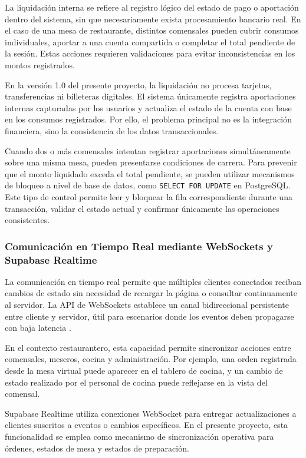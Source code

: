La liquidación interna se refiere al registro lógico del estado de pago o aportación
dentro del sistema, sin que necesariamente exista procesamiento bancario real. En el caso
de una mesa de restaurante, distintos comensales pueden cubrir consumos individuales,
aportar a una cuenta compartida o completar el total pendiente de la sesión. Estas acciones
requieren validaciones para evitar inconsistencias en los montos registrados.

En la versión 1.0 del presente proyecto, la liquidación no procesa tarjetas, transferencias
ni billeteras digitales. El sistema únicamente registra aportaciones internas capturadas
por los usuarios y actualiza el estado de la cuenta con base en los consumos registrados.
Por ello, el problema principal no es la integración financiera, sino la consistencia de los
datos transaccionales.

Cuando dos o más comensales intentan registrar aportaciones simultáneamente sobre una misma
mesa, pueden presentarse condiciones de carrera. Para prevenir que el monto liquidado exceda
el total pendiente, se pueden utilizar mecanismos de bloqueo a nivel de base de datos, como
\texttt{SELECT FOR UPDATE} en PostgreSQL. Este tipo de control permite leer y bloquear la fila
correspondiente durante una transacción, validar el estado actual y confirmar únicamente las
operaciones consistentes.

\subsubsection{Comunicación en Tiempo Real mediante WebSockets y Supabase Realtime}

La comunicación en tiempo real permite que múltiples clientes conectados reciban cambios
de estado sin necesidad de recargar la página o consultar continuamente al servidor. La API
de WebSockets establece un canal bidireccional persistente entre cliente y servidor, útil
para escenarios donde los eventos deben propagarse con baja latencia \cite{mdn_websocket}.

En el contexto restaurantero, esta capacidad permite sincronizar acciones entre comensales,
meseros, cocina y administración. Por ejemplo, una orden registrada desde la mesa virtual
puede aparecer en el tablero de cocina, y un cambio de estado realizado por el personal de
cocina puede reflejarse en la vista del comensal.

Supabase Realtime utiliza conexiones WebSocket para entregar actualizaciones a clientes
suscritos a eventos o cambios específicos. En el presente proyecto, esta funcionalidad se
emplea como mecanismo de sincronización operativa para órdenes, estados de mesa y estados
de preparación.

